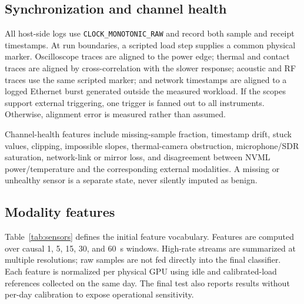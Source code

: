 \documentclass[sigplan,anonymous,review,nonacm]{acmart}
\begin{document}
\subsection{Synchronization and channel health}

All host-side logs use \texttt{CLOCK\_MONOTONIC\_RAW} and record both sample and receipt timestamps. At run boundaries, a scripted load step supplies a common physical marker. Oscilloscope traces are aligned to the power edge; thermal and contact traces are aligned by cross-correlation with the slower response; acoustic and RF traces use the same scripted marker; and network timestamps are aligned to a logged Ethernet burst generated outside the measured workload. If the scopes support external triggering, one trigger is fanned out to all instruments. Otherwise, alignment error is measured rather than assumed.

Channel-health features include missing-sample fraction, timestamp drift, stuck values, clipping, impossible slopes, thermal-camera obstruction, microphone/SDR saturation, network-link or mirror loss, and disagreement between NVML power/temperature and the corresponding external modalities. A missing or unhealthy sensor is a separate state, never silently imputed as benign.

\subsection{Modality features}

Table~\ref{tab:sensors} defines the initial feature vocabulary. Features are computed over causal 1, 5, 15, 30, and 60~s windows. High-rate streams are summarized at multiple resolutions; raw samples are not fed directly into the final classifier. Each feature is normalized per physical GPU using idle and calibrated-load references collected on the same day. The final test also reports results without per-day calibration to expose operational sensitivity.
\end{document}
